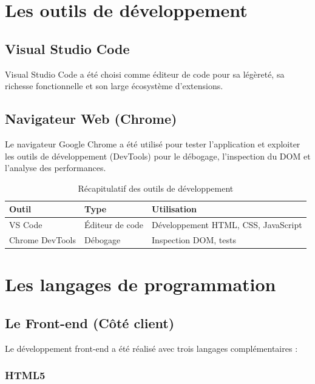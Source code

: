 \documentclass[12pt,a4paper,oneside]{report}
\renewcommand{\arraystretch}{1.3}
\begin{document}
\section{Les outils de développement}

\subsection{Visual Studio Code}

Visual Studio Code a été choisi comme éditeur de code pour sa légèreté, sa richesse fonctionnelle et son large écosystème d'extensions.

\subsection{Navigateur Web (Chrome)}

Le navigateur Google Chrome a été utilisé pour tester l'application et exploiter les outils de développement (DevTools) pour le débogage, l'inspection du DOM et l'analyse des performances.

\begin{table}[htbp]
    \centering
    \caption{Récapitulatif des outils de développement}
    \label{tab:outils}
    \renewcommand{\arraystretch}{1.5}
    \begin{tabular}{p{3.5cm} p{3.5cm} p{5.5cm}}
        \toprule
        \textbf{Outil} & \textbf{Type} & \textbf{Utilisation} \\
        \midrule
        VS Code & Éditeur de code & Développement HTML, CSS, JavaScript \\
        Chrome DevTools & Débogage & Inspection DOM, tests \\
        \bottomrule
    \end{tabular}
\end{table}

\section{Les langages de programmation}

\subsection{Le Front-end (Côté client)}

Le développement front-end a été réalisé avec trois langages complémentaires :

\subsubsection{HTML5}
\end{document}
